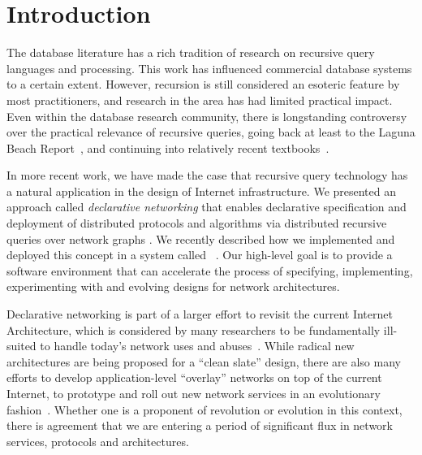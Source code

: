 \section{Introduction}

The database literature has a rich tradition of research on recursive
query languages and processing.  This work has influenced commercial
database systems to a certain extent.
However, recursion is still considered an esoteric feature
by most practitioners, and research in the area has had limited
practical impact.  Even within the database research community, there
is longstanding controversy over the practical relevance of recursive
queries, going back at least to the Laguna Beach
Report~\cite{lagbeach}, and continuing into relatively recent textbooks~\cite{redbook98}.

In more recent work, we have made the case that recursive query technology
has a natural application in the design of Internet infrastructure.
We presented an approach called {\em declarative networking} that enables
declarative specification and deployment of distributed protocols and
algorithms via distributed recursive queries over network
graphs \cite{declareRoute,declareOverlays,singhEurosys}.  
We recently described how we
implemented and deployed this concept in a system called
{\em \Sys}~\cite{declareOverlays,singhEurosys}.  Our high-level goal 
is to provide a software environment that can accelerate the
process of specifying, implementing, experimenting with and evolving
designs for network architectures.

Declarative networking is part of a larger effort to revisit the
current Internet Architecture, which is considered by many
researchers to be fundamentally ill-suited to handle today's network
uses and abuses~\cite{geni-report05}.  While radical new 
architectures are being proposed for a ``clean slate'' design, there
are also many efforts to develop application-level ``overlay''
networks on top of the current Internet, to prototype and roll out new
network services in an evolutionary fashion~\cite{virtualNetworks}.
Whether one is a proponent of revolution or evolution in this context,
there is agreement that we are entering a period of significant
flux in network services, protocols and architectures.

